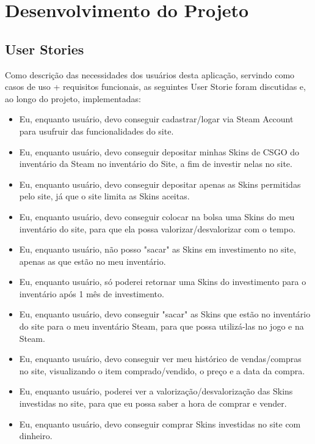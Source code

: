 

\chapter[Desenvolvimento do Projeto]{Desenvolvimento do Projeto}

\section{User Stories}
Como descrição das necessidades dos usuários desta aplicação, servindo como casos de uso + requisitos funcionais, as seguintes User Storie foram discutidas e, ao longo do projeto, implementadas:

\begin{itemize}
\item Eu, enquanto usuário, devo conseguir cadastrar/logar via Steam Account para usufruir das 
funcionalidades do site.

\item Eu, enquanto usuário, devo conseguir depositar minhas Skins de CSGO do inventário da Steam no 
inventário do Site, a fim de investir nelas no site.

\item Eu, enquanto usuário, devo conseguir depositar apenas as Skins permitidas pelo site, já que o 
site limita as Skins aceitas.

\item Eu, enquanto usuário, devo conseguir colocar na bolsa uma Skins do meu inventário do site, para 
que ela possa valorizar/desvalorizar com o tempo.

\item Eu, enquanto usuário, não posso "sacar" as Skins em investimento no site, apenas as que estão no 
meu inventário.

\item Eu, enquanto usuário, só poderei retornar uma Skins do investimento para o inventário após 1 mês 
de investimento.

\item Eu, enquanto usuário, devo conseguir "sacar" as Skins que estão no inventário do site para o meu 
inventário Steam, para que possa utilizá-las no jogo e na Steam.

\item Eu, enquanto usuário, devo conseguir ver meu histórico de vendas/compras no site, visualizando o 
item comprado/vendido, o preço e a data da compra.

\item Eu, enquanto usuário, poderei ver a valorização/desvalorização das Skins investidas no site, para 
que eu possa saber a hora de comprar e vender.

\item Eu, enquanto usuário, devo conseguir comprar Skins investidas no site com dinheiro.
\end{itemize}

